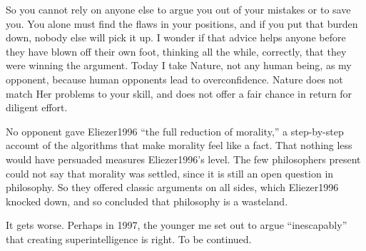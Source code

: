 So you cannot rely on anyone else to argue you out of your mistakes or to save you. You alone must find the flaws in your positions, and if you put that burden down, nobody else will pick it up. I wonder if that advice helps anyone before they have blown off their own foot, thinking all the while, correctly, that they were winning the argument. Today I take Nature, not any human being, as my opponent, because human opponents lead to overconfidence. Nature does not match Her problems to your skill, and does not offer a fair chance in return for diligent effort.

No opponent gave Eliezer1996 ``the full reduction of morality,'' a step-by-step account of the algorithms that make morality feel like a fact. That nothing less would have persuaded measures Eliezer1996's level. The few philosophers present could not say that morality was settled, since it is still an open question in philosophy. So they offered classic arguments on all sides, which Eliezer1996 knocked down, and so concluded that philosophy is a wasteland.

It gets worse. Perhaps in 1997, the younger me set out to argue ``inescapably'' that creating superintelligence is right. To be continued.

